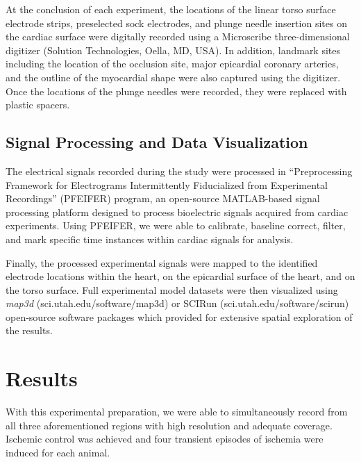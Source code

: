 \documentclass[twocolumn]{cinc}
\newcommand{\mapthreed}{\textit{map3d }}
\begin{document}

At the conclusion of each experiment, the locations of the linear torso
surface electrode strips, preselected sock electrodes, and
plunge needle insertion sites on the cardiac surface were digitally
recorded using a Microscribe three-dimensional digitizer (Solution
Technologies, Oella, MD, USA). In addition, landmark sites including the
location of the occlusion site, major epicardial
coronary arteries, and the outline of the myocardial shape were also
captured using the digitizer. Once the locations of the plunge needles were
recorded, they were replaced with plastic spacers.


\subsection{Signal Processing and Data Visualization}

The electrical signals recorded during the study were processed in
``Preprocessing Framework for Electrograms Intermittently Fiducialized from
Experimental Recordings'' (PFEIFER) program, an open-source MATLAB-based
signal processing platform designed to process bioelectric signals acquired
from cardiac experiments. \cite{Rodenhauser2018} Using
PFEIFER, we were able to calibrate, baseline correct, filter, and mark
specific time instances within cardiac signals for analysis.

Finally, the processed experimental signals were mapped to the
identified electrode locations within the heart, on the epicardial surface
of the heart, and on the torso surface. Full experimental model datasets
were then visualized using \mapthreed
(sci.utah.edu/software/map3d) or SCIRun
(sci.utah.edu/software/scirun) open-source software
packages which provided for
extensive spatial exploration of the results.

\section{Results}

With this experimental preparation, we were
able to simultaneously record from all three aforementioned regions with
high resolution and adequate coverage. Ischemic control was achieved and four transient episodes of
ischemia were induced for each animal.
\end{document}
